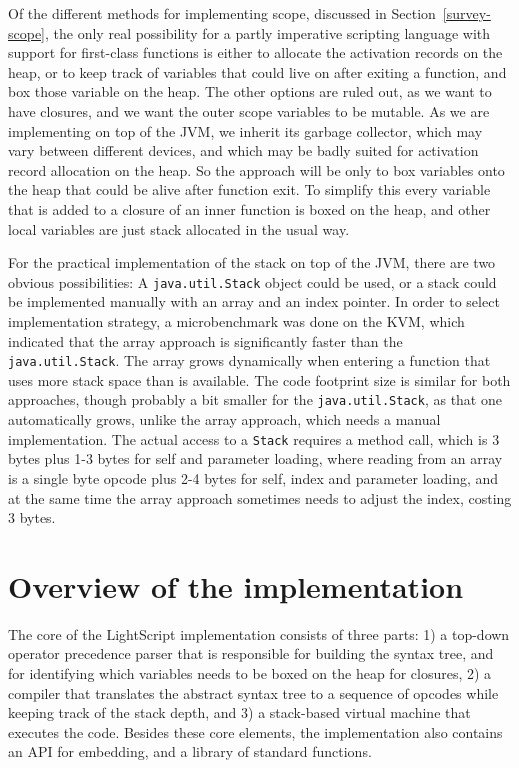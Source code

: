 \documentclass[11pt]{report}
\begin{document}
Of the different methods for implementing scope, discussed in Section~\ref{survey-scope}, the only real possibility for a partly imperative scripting language with support for first-class functions is either to allocate the activation records on the heap, or to keep track of variables that could live on after exiting a function, and box those variable on the heap.
The other options are ruled out, as we want to have closures, and we want the outer scope variables to be mutable.
As we are implementing on top of the JVM, we inherit its garbage collector, which may vary between different devices, and which may be badly suited for activation record allocation on the heap.
So the approach will be only to box variables onto the heap that could be alive after function exit.
To simplify this every variable that is added to a closure of an inner function is boxed on the heap, and other local variables are just stack allocated in the usual way. 

For the practical implementation of the stack on top of the JVM, there are two obvious possibilities: A \verb|java.util.Stack| object could be used, or a stack could be implemented manually with an array and an index pointer. 
In order to select implementation strategy, a microbenchmark was done on the KVM, which indicated that the array approach is significantly faster than the \verb|java.util.Stack|. The array grows dynamically when entering a function that uses more stack space than is available. 
The code footprint size is similar for both approaches, though probably a bit smaller for the {\tt java.util.Stack}, as that one automatically grows, unlike the array approach, which needs a manual implementation.
The actual access to a \verb|Stack| requires a method call, which is 3 bytes plus 1-3 bytes for self and parameter loading, where reading from an array is a single byte opcode plus 2-4 bytes for self, index and parameter loading, and at the same time the array approach sometimes needs to adjust the index, costing 3 bytes.

\section{Overview of the implementation}
The core of the LightScript implementation consists of three parts: 1) a top-down operator precedence parser that is responsible for building the syntax tree, and for identifying which variables needs to be boxed on the heap for closures, 2) a compiler that translates the abstract syntax tree to a sequence of opcodes while keeping track of the stack depth, and 3) a stack-based virtual machine that executes the code.
Besides these core elements, the implementation also contains an API for embedding, and a library of standard functions.
\end{document}

